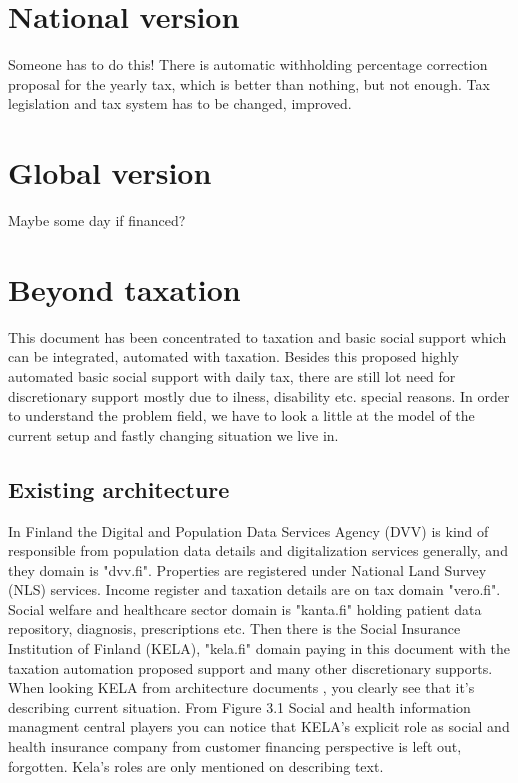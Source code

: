 \section{National version}
\label{implementation_national}
Someone has to do this! There is automatic withholding percentage correction
proposal for the yearly tax, which is better than nothing, but not enough.
Tax legislation and tax system has to be changed, improved.

\section{Global version}
\label{implementation_global}
Maybe some day if financed?

\section{Beyond taxation}
\label{beyond_taxation}
This document has been concentrated to taxation and basic social support
which can be integrated, automated with taxation.
Besides this proposed highly automated basic social support with daily tax,
there are still lot need for discretionary support mostly due to ilness,
disability etc. special reasons. In order to understand the problem field,
we have to look a little at the model of the current setup
and fastly changing situation we live in.

\subsection{Existing architecture}
\label{existing_architecture}

In Finland the Digital and Population Data Services Agency (DVV)
is kind of responsible from population data details
and digitalization services generally, and they domain is "dvv.fi".
Properties are registered under National Land Survey (NLS) services.
Income register and taxation details are on tax domain "vero.fi".
Social welfare and healthcare sector domain is "kanta.fi"
holding patient data repository, diagnosis, prescriptions etc.
Then there is the Social Insurance Institution of Finland (KE\-LA),
"kela.fi" domain paying in this document with the taxation automation proposed support
and many other discretionary supports. When looking KE\-LA from architecture documents \cite{SYPLJULK},
you clearly see that it's describing current situation.
From Figure 3.1 Social and health information managment central players \cite{SYPLJULK_Kuva_3.1}
you can notice that KE\-LA's explicit role as social and health insurance company from customer financing perspective is left out, forgotten.
Kela's roles are only mentioned on describing text.

